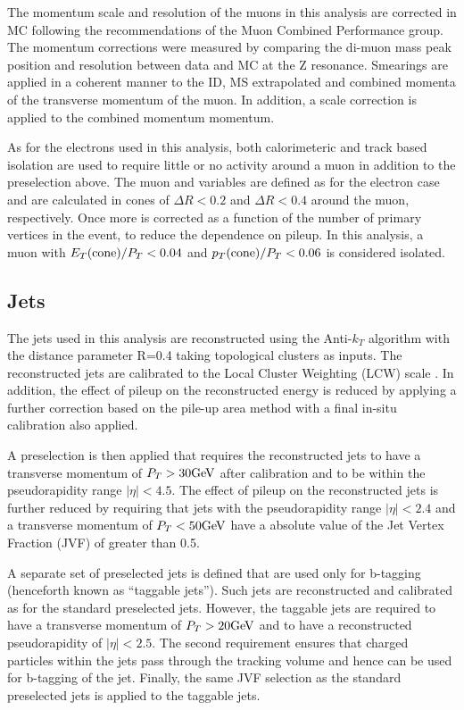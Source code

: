 The momentum scale and resolution of the muons in this analysis are
corrected in MC following the recommendations of the Muon Combined
Performance group. The momentum corrections were measured by comparing
the di-muon mass peak position and resolution between data and MC at
the Z resonance. Smearings are applied in a coherent manner to
the ID, MS extrapolated and combined momenta of the transverse
momentum of the muon. In addition, a scale correction is applied to
the combined momentum momentum.

As for the electrons used in this analysis, both calorimeteric and
track based isolation are used to require little or no activity around a muon
in addition to the preselection above. The muon \etcone and \ptcone
variables are defined as for the electron case and are calculated
in cones of $\Delta R<0.2$ and $\Delta R<0.4$ around the muon, respectively. 
Once more \etcone is corrected as a function of the number of primary vertices in the
event, to reduce the dependence on pileup. In this analysis, a muon with
$E_{T}(\mathrm{cone})/P_{T}<0.04$ and $p_{T}(\mathrm{cone})/P_{T}<0.06$ is considered isolated.


\subsection{Jets}
\label{sec:presel:jet}

The jets used in this analysis are reconstructed using the Anti-$k_T$
algorithm \cite{AntiKT} with the distance parameter R=0.4 taking
topological clusters as inputs. The reconstructed jets are calibrated
to the Local Cluster Weighting (LCW) scale \cite{jetenergyscale}. In
addition, the effect of pileup on the reconstructed energy is reduced
by applying a further correction based on the pile-up area method with
a final in-situ calibration also applied.

A preselection is then applied that requires the reconstructed jets
to have a transverse momentum of $P_{T} > 30\text{GeV}$ after calibration  and
to be within the pseudorapidity range $|\eta| < 4.5$. The effect of pileup on
the reconstructed jets is further reduced by requiring that jets with
the pseudorapidity range $|\eta|<2.4$ and a transverse momentum of $P_{T} <
50\text{GeV}$ have a absolute value of the Jet Vertex Fraction (JVF) of greater than 0.5.

A separate set of preselected jets is defined that are used only for
b-tagging (henceforth known as ``taggable jets''). Such jets are
reconstructed and calibrated as for the standard preselected
jets. However, the taggable jets are required to have a transverse
momentum of $P_{T} > 20\text{GeV}$ and to have a reconstructed pseudorapidity
of $|\eta| < 2.5$. The second requirement ensures that charged
particles within the jets pass through the tracking volume and hence
can be used for b-tagging of the jet. Finally, the same JVF selection
as the standard preselected jets is applied to the taggable jets.

